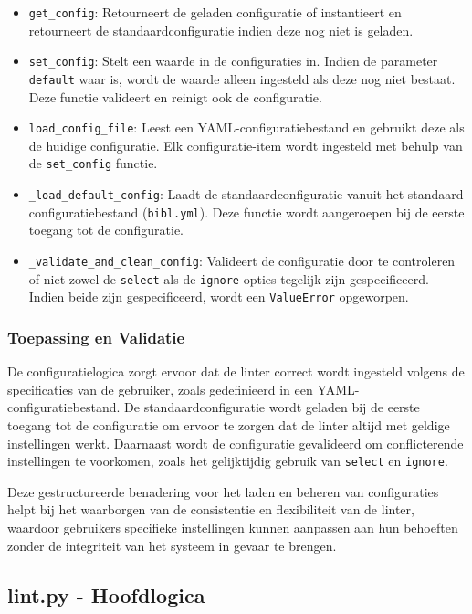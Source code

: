 \begin{itemize}
    \item \texttt{get\_config}: Retourneert de geladen configuratie of instantieert en retourneert de standaardconfiguratie indien deze nog niet is geladen.
    \item \texttt{set\_config}: Stelt een waarde in de configuraties in. Indien de parameter \texttt{default} waar is, wordt de waarde alleen ingesteld als deze nog niet bestaat. Deze functie valideert en reinigt ook de configuratie.
    \item \texttt{load\_config\_file}: Leest een YAML-configuratiebestand en gebruikt deze als de huidige configuratie. Elk configuratie-item wordt ingesteld met behulp van de \texttt{set\_config} functie.
    \item \texttt{\_load\_default\_config}: Laadt de standaardconfiguratie vanuit het standaard configuratiebestand (\texttt{bibl.yml}). Deze functie wordt aangeroepen bij de eerste toegang tot de configuratie.
    \item \texttt{\_validate\_and\_clean\_config}: Valideert de configuratie door te controleren of niet zowel de \texttt{select} als de \texttt{ignore} opties tegelijk zijn gespecificeerd. Indien beide zijn gespecificeerd, wordt een \texttt{ValueError} opgeworpen.
\end{itemize}

\subsubsection{Toepassing en Validatie}

De configuratielogica zorgt ervoor dat de linter correct wordt ingesteld volgens de specificaties van de gebruiker, zoals gedefinieerd in een YAML-configuratiebestand. De standaardconfiguratie wordt geladen bij de eerste toegang tot de configuratie om ervoor te zorgen dat de linter altijd met geldige instellingen werkt. Daarnaast wordt de configuratie gevalideerd om conflicterende instellingen te voorkomen, zoals het gelijktijdig gebruik van \texttt{select} en \texttt{ignore}.

Deze gestructureerde benadering voor het laden en beheren van configuraties helpt bij het waarborgen van de consistentie en flexibiliteit van de linter, waardoor gebruikers specifieke instellingen kunnen aanpassen aan hun behoeften zonder de integriteit van het systeem in gevaar te brengen.
\subsection{lint.py - Hoofdlogica}

